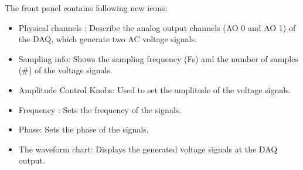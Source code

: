 \documentclass[journal=jacsat,manuscript=article]{achemso}
\begin{document}
The front panel contains following new icons:
\begin{itemize}
	\item Physical channels : Describe the analog output channels (AO 0 and AO 1) of the DAQ, which generate two AC voltage signals.
	\item Sampling info: Shows the sampling frequency (Fs) and the number of samples (\#) of the voltage signals.
	\item Amplitude Control Knobs: Used to set the amplitude of the voltage signals.
	\item Frequency : Sets the frequency of the signals.
	\item Phase: Sets the phase of the signals.
	\item The waveform chart: Displays the generated voltage signals at the DAQ output.	
\end{itemize}
\end{document}
